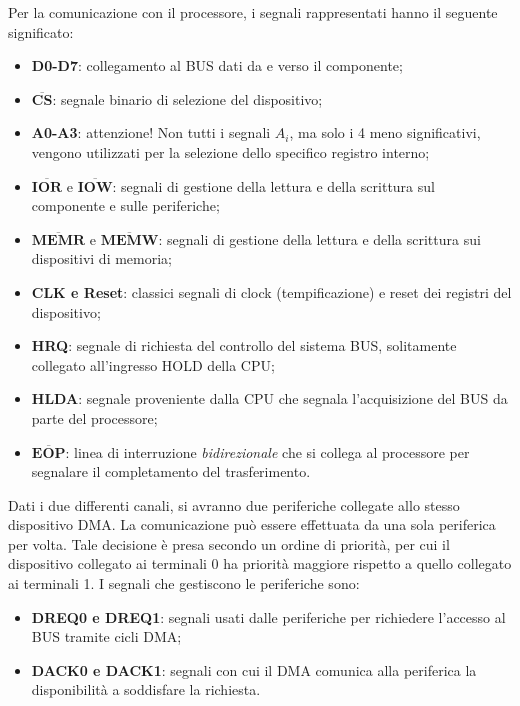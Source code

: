 Per la comunicazione con il processore, i segnali rappresentati hanno il seguente significato:
\begin{itemize}
    \item \textbf{D0-D7}: collegamento al BUS dati da e verso il componente;
    \item $\overline{\mathbf{CS}}$: segnale binario di selezione del dispositivo;
    \item \textbf{A0-A3}: attenzione! Non tutti i segnali $A_i$, ma solo i 4 meno significativi, vengono utilizzati per la selezione dello specifico registro interno;
    \item $\overline{\mathbf{IOR}}$ e $\overline{\mathbf{IOW}}$: segnali di gestione della lettura e della scrittura sul componente e sulle periferiche;
    \item $\overline{\mathbf{MEMR}}$ e $\overline{\mathbf{MEMW}}$: segnali di gestione della lettura e della scrittura sui dispositivi di memoria;
    \item \textbf{CLK e Reset}: classici segnali di clock (tempificazione) e reset dei registri del dispositivo;
    \item \textbf{HRQ}: segnale di richiesta del controllo del sistema BUS, solitamente collegato all'ingresso HOLD della CPU;
    \item \textbf{HLDA}: segnale proveniente dalla CPU che segnala l'acquisizione del BUS da parte del processore;
    \item $\overline{\mathbf{EOP}}$: linea di interruzione \textit{bidirezionale} che si collega al processore per segnalare il completamento del trasferimento.
\end{itemize}

Dati i due differenti canali, si avranno due periferiche collegate allo stesso dispositivo DMA. La comunicazione può essere effettuata da una sola periferica per volta. Tale decisione è presa secondo un ordine di priorità, per cui il dispositivo collegato ai terminali 0 ha priorità maggiore rispetto a quello collegato ai terminali 1. I segnali che gestiscono le periferiche sono:
\begin{itemize}
    \item \textbf{DREQ0 e DREQ1}: segnali usati dalle periferiche per richiedere l'accesso al BUS tramite cicli DMA;
    \item \textbf{DACK0 e DACK1}: segnali con cui il DMA comunica alla periferica la disponibilità a soddisfare la richiesta.
\end{itemize}

